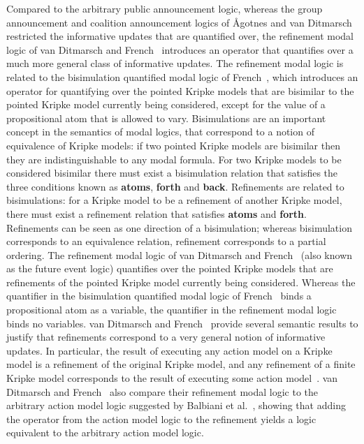 Compared to the arbitrary public announcement logic, whereas the group
announcement and coalition announcement logics of {\AA}gotnes and van
Ditmarsch~\cite{agotnes:2008} restricted the informative updates that are
quantified over, the refinement modal logic of van Ditmarsch and
French~\cite{vanditmarsch:2009} introduces an operator that quantifies over a
much more general class of informative updates. The refinement modal logic is
related to the bisimulation quantified modal logic of French~\cite{french:2006},
which introduces an operator for quantifying over the pointed Kripke models that
are bisimilar to the pointed Kripke model currently being considered, except for
the value of a propositional atom that is allowed to vary. Bisimulations are an
important concept in the semantics of modal logics, that correspond to a notion
of equivalence of Kripke models: if two pointed Kripke models are bisimilar then
they are indistinguishable to any modal formula. For two Kripke models to be
considered bisimilar there must exist a bisimulation relation that satisfies the
three conditions known as {\bf atoms}, {\bf forth} and {\bf back}. Refinements
are related to bisimulations: for a Kripke model to be a refinement of another
Kripke model, there must exist a refinement relation that satisfies {\bf atoms}
and {\bf forth}. Refinements can be seen as one direction of a bisimulation;
whereas bisimulation corresponds to an equivalence relation, refinement
corresponds to a partial ordering. The refinement modal logic of van Ditmarsch
and French~\cite{vanditmarsch:2009} (also known as the future event logic)
quantifies over the pointed Kripke models that are refinements of the pointed
Kripke model currently being considered. Whereas the quantifier in the
bisimulation quantified modal logic of French~\cite{french:2006} binds a
propositional atom as a variable, the quantifier in the refinement 
modal logic binds no variables. van Ditmarsch and French~\cite{vanditmarsch:2009}
provide several semantic results to justify that refinements correspond to a
very general notion of informative updates. In particular, the result of
executing any action model on a Kripke model is a refinement of the original
Kripke model, and any refinement of a finite Kripke model corresponds to the
result of executing some action model~\cite{vanditmarsch:2009}. van Ditmarsch and
French~\cite{vanditmarsch:2009} also compare their refinement modal logic to the
arbitrary action model logic suggested by Balbiani et al.~\cite{balbiani:2007},
showing that adding the operator from the action model logic to the refinement
yields a logic equivalent to the arbitrary action model logic.

